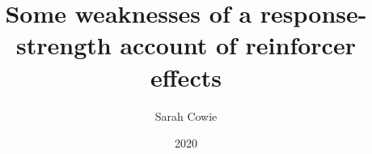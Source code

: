 \documentclass[a4paper,12pt]{article}
\title{Some weaknesses of a response-strength account of reinforcer effects}
\author{Sarah Cowie}
\date{2020}
\begin{document}
{\scshape\bfseries \maketitle}
\end{document}
